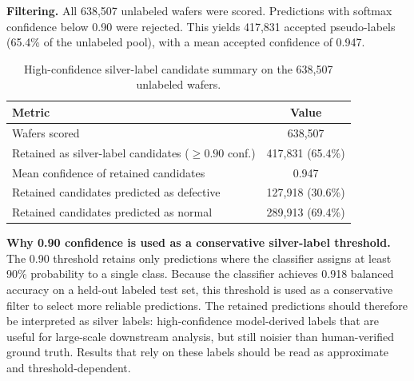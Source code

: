 \documentclass[11pt]{article}
\begin{document}
\textbf{Filtering.} All 638,507 unlabeled wafers were scored. Predictions with softmax confidence below 0.90 were rejected. This yields 417,831 accepted pseudo-labels (65.4\% of the unlabeled pool), with a mean accepted confidence of 0.947.

\begin{table}[H]
\centering
\caption{High-confidence silver-label candidate summary on the 638,507 unlabeled wafers.}
\label{tab:pseudolabel_summary}
\begin{tabular}{lc}
\toprule
Metric & Value \\
\midrule
Wafers scored & 638{,}507 \\
Retained as silver-label candidates ($\geq 0.90$ conf.) & 417{,}831 (65.4\%) \\
Mean confidence of retained candidates & 0.947 \\
Retained candidates predicted as defective & 127{,}918 (30.6\%) \\
Retained candidates predicted as normal & 289{,}913 (69.4\%) \\
\bottomrule
\end{tabular}
\end{table}

\textbf{Why 0.90 confidence is used as a conservative silver-label threshold.} The 0.90 threshold retains only predictions where the classifier assigns at least 90\% probability to a single class. Because the classifier achieves 0.918 balanced accuracy on a held-out labeled test set, this threshold is used as a conservative filter to select more reliable predictions. The retained predictions should therefore be interpreted as silver labels: high-confidence model-derived labels that are useful for large-scale downstream analysis, but still noisier than human-verified ground truth. Results that rely on these labels should be read as approximate and threshold-dependent.
\end{document}
